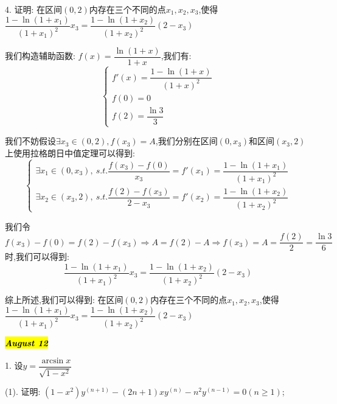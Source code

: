 4. 证明:  在区间$(0,2)$内存在三个不同的点$x_{1},x_{2},x_{3}$,使得$\dfrac{1-\ln(1+x_{1})}{(1+x_{1})^2}x_{3}=\dfrac{1-\ln(1+x_{2})}{(1+x_{2})^2}(2-x_{3})$
\begin{solution}

	我们构造辅助函数:  $f(x)=\dfrac{\ln(1+x)}{1+x}$,我们有:  
	$$\left\lbrace 
	\begin{array}{l}
		f'(x)=\dfrac{1-\ln(1+x)}{(1+x)^2}\\
		f(0)=0\\
		f(2)=\dfrac{\ln 3}{3}
	\end{array}
	\right. $$
	
	我们不妨假设$\exists x_{3}\in(0,2), f(x_{3})=A$,我们分别在区间$(0,x_{3})$和区间$(x_{3},2)$上使用拉格朗日中值定理可以得到:  
	$$\left\lbrace 
	\begin{array}{l}
		\exists x_{1}\in(0,x_{3}),\ s.t. \dfrac{f(x_{3})-f(0)}{x_{3}}=f'(x_{1})=\dfrac{1-\ln(1+x_{1})}{(1+x_{1})^2}\\
		\exists x_{2}\in(x_{3},2),\ s.t. \dfrac{f(2)-f(x_{3})}{2-x_{3}}=f'(x_{2})=\dfrac{1-\ln(1+x_{2})}{(1+x_{2})^2}
	\end{array}
	\right. $$
	
	我们令$f(x_{3})-f(0)=f(2)-f(x_{3})\Rightarrow A=f(2)-A\Rightarrow f(x_{3})=A=\dfrac{f(2)}{2}=\dfrac{\ln 3}{6}$时,我们可以得到:  $$\dfrac{1-\ln(1+x_{1})}{(1+x_{1})^2}x_{3}=\dfrac{1-\ln(1+x_{2})}{(1+x_{2})^2}(2-x_{3})$$
	
	综上所述,我们可以得到:  在区间$(0,2)$内存在三个不同的点$x_{1},x_{2},x_{3}$,使得$\dfrac{1-\ln(1+x_{1})}{(1+x_{1})^2}x_{3}=\dfrac{1-\ln(1+x_{2})}{(1+x_{2})^2}(2-x_{3})$
\end{solution}

\hl{\textbf{\textit{August 12}}}

1. 设$y=\dfrac{\arcsin x}{\sqrt{1-x^2}}$

(1). 证明:  $(1-x^2)y^{(n+1)}-(2n+1)xy^{(n)}-n^2y^{(n-1)}=0(n\geq 1)$;

